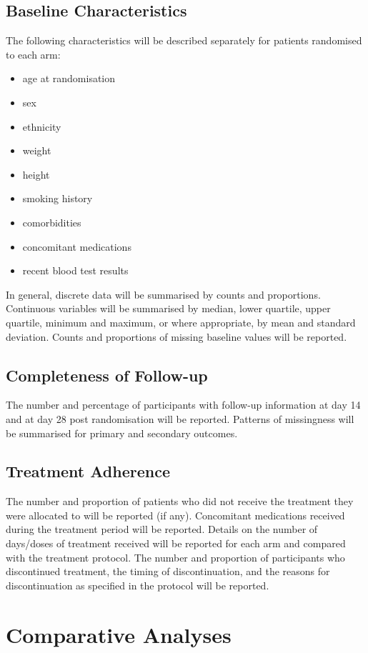 \documentclass[11pt,parskip=half-]{scrartcl}
\begin{document}
\subsection{Baseline Characteristics}
The following characteristics will be described separately for patients randomised to each arm:
\begin{itemize}
    \item age at randomisation
    \item sex
    \item ethnicity
    \item weight
    \item height
    \item smoking history
    \item comorbidities
    \item concomitant medications
    \item recent blood test results
\end{itemize}
In general, discrete data will be summarised by counts and proportions. Continuous variables will be summarised by median, lower quartile, upper quartile, minimum and maximum, or where appropriate, by mean and standard deviation. Counts and proportions of missing baseline values will be reported.

\subsection{Completeness of Follow-up}
The number and percentage of participants with follow-up information at day 14 and at day 28 post randomisation will be reported. Patterns of missingness will be summarised for primary and secondary outcomes.

\subsection{Treatment Adherence}
The number and proportion of patients who did not receive the treatment they were allocated to will be reported (if any). Concomitant medications received during the treatment period will be reported. Details on the number of days/doses of treatment received will be reported for each arm and compared with the treatment protocol. The number and proportion of participants who discontinued treatment, the timing of discontinuation, and the reasons for discontinuation as specified in the protocol will be reported.

\clearpage

\section{Comparative Analyses}
\end{document}
